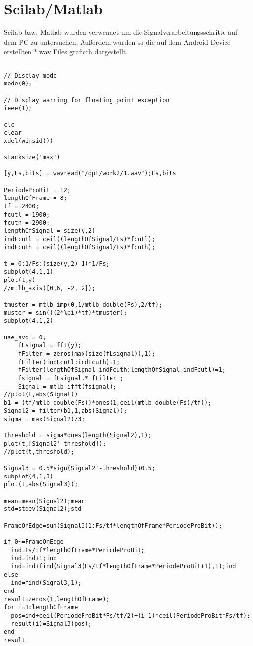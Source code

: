 \documentclass[10pt]{scrartcl}
\begin{document}
\part{Scilab/Matlab}
Scilab bzw. Matlab wurden verwendet um die Signalverarbeitungsschritte auf dem PC zu untersuchen. Außerdem wurden so die auf dem Android Device erstellten *.wav Files grafisch dargestellt.
\begin{tiny}
\begin{lstlisting}

// Display mode
mode(0);

// Display warning for floating point exception
ieee(1);

clc
clear
xdel(winsid())

stacksize('max')

[y,Fs,bits] = wavread("/opt/work2/1.wav");Fs,bits

PeriodeProBit = 12;
lengthOfFrame = 8;
tf = 2400;
fcutl = 1900;
fcuth = 2900;
lengthOfSignal = size(y,2)
indFcutl = ceil((lengthOfSignal/Fs)*fcutl);
indFcuth = ceil((lengthOfSignal/Fs)*fcuth);

t = 0:1/Fs:(size(y,2)-1)*1/Fs;
subplot(4,1,1)
plot(t,y)
//mtlb_axis([0,6, -2, 2]);

tmuster = mtlb_imp(0,1/mtlb_double(Fs),2/tf);
muster = sin(((2*%pi)*tf)*tmuster);
subplot(4,1,2)

use_svd = 0;
    fLsignal = fft(y);
    fFilter = zeros(max(size(fLsignal)),1);
    fFilter(indFcutl:indFcuth)=1;
    fFilter(lengthOfSignal-indFcuth:lengthOfSignal-indFcutl)=1;
    fsignal = fLsignal.* fFilter';
    Signal = mtlb_ifft(fsignal);
//plot(t,abs(Signal))
b1 = (tf/mtlb_double(Fs))*ones(1,ceil(mtlb_double(Fs)/tf));
Signal2 = filter(b1,1,abs(Signal));
sigma = max(Signal2)/3;

threshold = sigma*ones(length(Signal2),1);
plot(t,[Signal2' threshold]);
//plot(t,threshold);

Signal3 = 0.5*sign(Signal2'-threshold)+0.5;
subplot(4,1,3)
plot(t,abs(Signal3));

mean=mean(Signal2);mean
std=stdev(Signal2);std

FrameOnEdge=sum(Signal3(1:Fs/tf*lengthOfFrame*PeriodeProBit));

if 0~=FrameOnEdge
  ind=Fs/tf*lengthOfFrame*PeriodeProBit;
  ind=ind+1;ind
  ind=ind+find(Signal3(Fs/tf*lengthOfFrame*PeriodeProBit+1),1);ind
else
  ind=find(Signal3,1);
end
result=zeros(1,lengthOfFrame);
for i=1:lengthOfFrame
  pos=ind+ceil(PeriodeProBit*Fs/tf/2)+(i-1)*ceil(PeriodeProBit*Fs/tf);
  result(i)=Signal3(pos);
end
result

\end{lstlisting}
\end{tiny}
\end{document}
